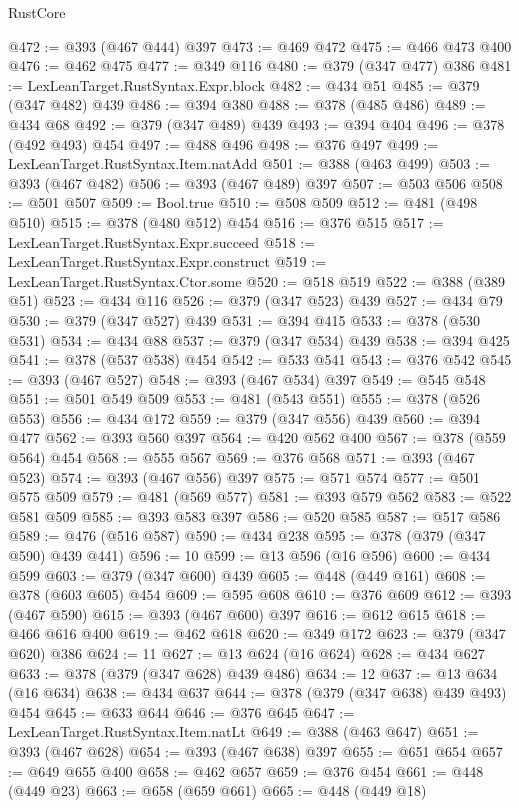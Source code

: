 \begin{lexlean}{RustCore}
\begin{coremodule}
@472 := @393 (@467 @444) @397
@473 := @469 @472
@475 := @466 @473 @400
@476 := @462 @475
@477 := @349 @116
@480 := @379 (@347 @477) @386
@481 := LexLeanTarget.RustSyntax.Expr.block
@482 := @434 @51
@485 := @379 (@347 @482) @439
@486 := @394 @380
@488 := @378 (@485 @486)
@489 := @434 @68
@492 := @379 (@347 @489) @439
@493 := @394 @404
@496 := @378 (@492 @493) @454
@497 := @488 @496
@498 := @376 @497
@499 := LexLeanTarget.RustSyntax.Item.natAdd
@501 := @388 (@463 @499)
@503 := @393 (@467 @482)
@506 := @393 (@467 @489) @397
@507 := @503 @506
@508 := @501 @507
@509 := Bool.true
@510 := @508 @509
@512 := @481 (@498 @510)
@515 := @378 (@480 @512) @454
@516 := @376 @515
@517 := LexLeanTarget.RustSyntax.Expr.succeed
@518 := LexLeanTarget.RustSyntax.Expr.construct
@519 := LexLeanTarget.RustSyntax.Ctor.some
@520 := @518 @519
@522 := @388 (@389 @51)
@523 := @434 @116
@526 := @379 (@347 @523) @439
@527 := @434 @79
@530 := @379 (@347 @527) @439
@531 := @394 @415
@533 := @378 (@530 @531)
@534 := @434 @88
@537 := @379 (@347 @534) @439
@538 := @394 @425
@541 := @378 (@537 @538) @454
@542 := @533 @541
@543 := @376 @542
@545 := @393 (@467 @527)
@548 := @393 (@467 @534) @397
@549 := @545 @548
@551 := @501 @549 @509
@553 := @481 (@543 @551)
@555 := @378 (@526 @553)
@556 := @434 @172
@559 := @379 (@347 @556) @439
@560 := @394 @477
@562 := @393 @560 @397
@564 := @420 @562 @400
@567 := @378 (@559 @564) @454
@568 := @555 @567
@569 := @376 @568
@571 := @393 (@467 @523)
@574 := @393 (@467 @556) @397
@575 := @571 @574
@577 := @501 @575 @509
@579 := @481 (@569 @577)
@581 := @393 @579 @562
@583 := @522 @581 @509
@585 := @393 @583 @397
@586 := @520 @585
@587 := @517 @586
@589 := @476 (@516 @587)
@590 := @434 @238
@595 := @378 (@379 (@347 @590) @439 @441)
@596 := 10
@599 := @13 @596 (@16 @596)
@600 := @434 @599
@603 := @379 (@347 @600) @439
@605 := @448 (@449 @161)
@608 := @378 (@603 @605) @454
@609 := @595 @608
@610 := @376 @609
@612 := @393 (@467 @590)
@615 := @393 (@467 @600) @397
@616 := @612 @615
@618 := @466 @616 @400
@619 := @462 @618
@620 := @349 @172
@623 := @379 (@347 @620) @386
@624 := 11
@627 := @13 @624 (@16 @624)
@628 := @434 @627
@633 := @378 (@379 (@347 @628) @439 @486)
@634 := 12
@637 := @13 @634 (@16 @634)
@638 := @434 @637
@644 := @378 (@379 (@347 @638) @439 @493) @454
@645 := @633 @644
@646 := @376 @645
@647 := LexLeanTarget.RustSyntax.Item.natLt
@649 := @388 (@463 @647)
@651 := @393 (@467 @628)
@654 := @393 (@467 @638) @397
@655 := @651 @654
@657 := @649 @655 @400
@658 := @462 @657
@659 := @376 @454
@661 := @448 (@449 @23)
@663 := @658 (@659 @661)
@665 := @448 (@449 @18)

\end{coremodule}
\end{lexlean}
